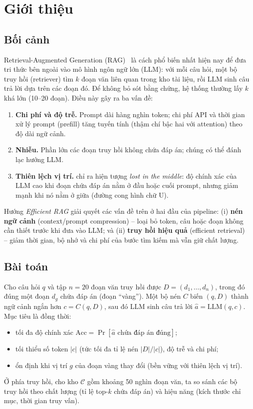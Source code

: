 \section{Giới thiệu}
\label{sec:intro}

\subsection{Bối cảnh}

Retrieval-Augmented Generation (RAG)~\cite{lewis2020rag} là cách phổ biến nhất hiện nay để đưa tri
thức bên ngoài vào mô hình ngôn ngữ lớn (LLM): với mỗi câu hỏi, một bộ truy hồi (retriever) tìm
$k$ đoạn văn liên quan trong kho tài liệu, rồi LLM sinh câu trả lời dựa trên các đoạn đó. Để không bỏ
sót bằng chứng, hệ thống thường lấy $k$ khá lớn (10--20 đoạn). Điều này gây ra ba vấn đề:

\begin{enumerate}
  \item \textbf{Chi phí và độ trễ.} Prompt dài hàng nghìn token; chi phí API và thời gian xử lý
  prompt (prefill) tăng tuyến tính (thậm chí bậc hai với attention) theo độ dài ngữ cảnh.
  \item \textbf{Nhiễu.} Phần lớn các đoạn truy hồi không chứa đáp án; chúng có thể đánh lạc hướng LLM.
  \item \textbf{Thiên lệch vị trí.} \citet{liu2024lost} chỉ ra hiện tượng \emph{lost in the middle}:
  độ chính xác của LLM cao khi đoạn chứa đáp án nằm ở đầu hoặc cuối prompt, nhưng giảm mạnh khi nó
  nằm ở giữa (đường cong hình chữ U).
\end{enumerate}

Hướng \emph{Efficient RAG} giải quyết các vấn đề trên ở hai đầu của pipeline: (i) \textbf{nén ngữ
cảnh} (context/prompt compression) -- loại bỏ token, câu hoặc đoạn không cần thiết trước khi đưa vào
LLM; và (ii) \textbf{truy hồi hiệu quả} (efficient retrieval) -- giảm thời gian, bộ nhớ và chi phí
của bước tìm kiếm mà vẫn giữ chất lượng.

\subsection{Bài toán}

Cho câu hỏi $q$ và tập $n=20$ đoạn văn truy hồi được $D=(d_1,\dots,d_n)$, trong đó đúng một đoạn
$d_g$ chứa đáp án (đoạn ``vàng''). Một bộ nén $C$ biến $(q, D)$ thành ngữ cảnh ngắn hơn
$c = C(q, D)$, sau đó LLM sinh câu trả lời $\hat a = \mathrm{LLM}(q, c)$. Mục tiêu là đồng thời:
\begin{itemize}
  \item tối đa độ chính xác $\mathrm{Acc} = \Pr[\hat a \text{ chứa đáp án đúng}]$;
  \item tối thiểu số token $|c|$ (tức tối đa tỉ lệ nén $|D|/|c|$), độ trễ và chi phí;
  \item ổn định khi vị trí $g$ của đoạn vàng thay đổi (bền vững với thiên lệch vị trí).
\end{itemize}
Ở phía truy hồi, cho kho $\mathcal{C}$ gồm khoảng 50 nghìn đoạn văn, ta so sánh các bộ truy hồi theo
chất lượng (tỉ lệ top-$k$ chứa đáp án) và hiệu năng (kích thước chỉ mục, thời gian truy vấn).

